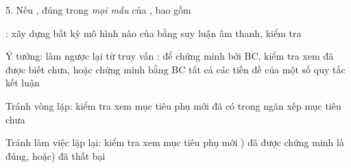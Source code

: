 \documentclass{article}
\begin{document}
\begin{huge}
5. Nếu ,  đúng trong \emph{mọi mẫu } của , bao gồm 

: xây dựng bất kỳ mô hình nào của  bằng suy luận âm thanh, kiểm tra \mat{$\alpha$}


Ý tưởng: làm ngược lại từ truy vấn :\al
   để chứng minh  bởi BC,\nl
      kiểm tra xem  đã được biết chưa, hoặc \nl
      chứng minh bằng BC tất cả các tiền đề của một số quy tắc kết luận 

Tránh vòng lặp: kiểm tra xem mục tiêu phụ mới đã có trong ngăn xếp mục tiêu chưa

Tránh làm việc lặp lại: kiểm tra xem mục tiêu phụ mới ) đã được chứng minh là đúng, hoặc) đã thất bại


\maxfigwidth
{}


\maxfigwidth
{}


\maxfigwidth
{}


\maxfigwidth
{}


\maxfigwidth
{}


\maxfigwidth
{}



\end{huge}
\end{document}
